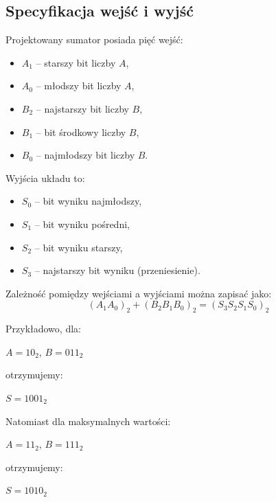 \documentclass[11pt]{article}
\begin{document}
\subsection{Specyfikacja wejść i wyjść}

Projektowany sumator posiada pięć wejść:
\begin{itemize}
    \item \(A_1\) -- starszy bit liczby \(A\),
    \item \(A_0\) -- młodszy bit liczby \(A\),
    \item \(B_2\) -- najstarszy bit liczby \(B\),
    \item \(B_1\) -- bit środkowy liczby \(B\),
    \item \(B_0\) -- najmłodszy bit liczby \(B\).
\end{itemize}

Wyjścia układu to:
\begin{itemize}
    \item \(S_0\) -- bit wyniku najmłodszy,
    \item \(S_1\) -- bit wyniku pośredni,
    \item \(S_2\) -- bit wyniku starszy,
    \item \(S_3\) -- najstarszy bit wyniku (przeniesienie).
\end{itemize}

Zależność pomiędzy wejściami a wyjściami można zapisać jako:
\begin{equation}
(A_1 A_0)_2 + (B_2 B_1 B_0)_2 = (S_3 S_2 S_1 S_0)_2
\end{equation}

Przykładowo, dla:
\begin{center}
$A = 10_2$, $B = 011_2$
\end{center}
otrzymujemy:
\begin{center}
$S = 1001_2$
\end{center}

Natomiast dla maksymalnych wartości:
\begin{center}
$A = 11_2$, $B = 111_2$
\end{center}
otrzymujemy:
\begin{center}
$S = 1010_2$
\end{center}
\end{document}
